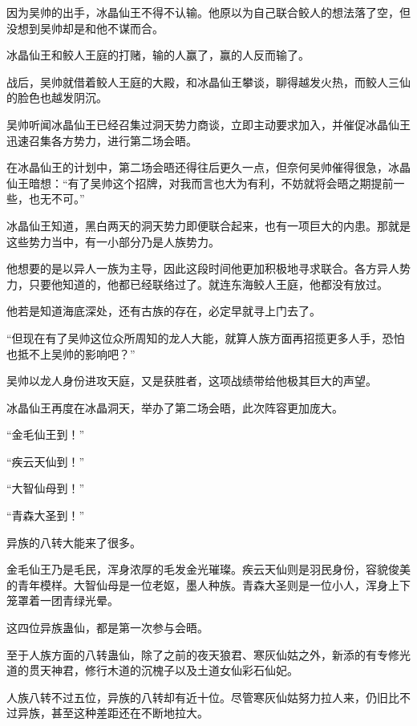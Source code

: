 
\begin{this_body}

因为吴帅的出手，冰晶仙王不得不认输。他原以为自己联合鲛人的想法落了空，但没想到吴帅却是和他不谋而合。

冰晶仙王和鲛人王庭的打赌，输的人赢了，赢的人反而输了。

战后，吴帅就借着鲛人王庭的大殿，和冰晶仙王攀谈，聊得越发火热，而鲛人三仙的脸色也越发阴沉。

吴帅听闻冰晶仙王已经召集过洞天势力商谈，立即主动要求加入，并催促冰晶仙王迅速召集各方势力，进行第二场会晤。

在冰晶仙王的计划中，第二场会晤还得往后更久一点，但奈何吴帅催得很急，冰晶仙王暗想：“有了吴帅这个招牌，对我而言也大为有利，不妨就将会晤之期提前一些，也无不可。”

冰晶仙王知道，黑白两天的洞天势力即便联合起来，也有一项巨大的内患。那就是这些势力当中，有一小部分乃是人族势力。

他想要的是以异人一族为主导，因此这段时间他更加积极地寻求联合。各方异人势力，只要他知道的，他都已经联络过了。就连东海鲛人王庭，他都没有放过。

他若是知道海底深处，还有古族的存在，必定早就寻上门去了。

“但现在有了吴帅这位众所周知的龙人大能，就算人族方面再招揽更多人手，恐怕也抵不上吴帅的影响吧？”

吴帅以龙人身份进攻天庭，又是获胜者，这项战绩带给他极其巨大的声望。

冰晶仙王再度在冰晶洞天，举办了第二场会晤，此次阵容更加庞大。

“金毛仙王到！”

“疾云天仙到！”

“大智仙母到！”

“青森大圣到！”

异族的八转大能来了很多。

金毛仙王乃是毛民，浑身浓厚的毛发金光璀璨。疾云天仙则是羽民身份，容貌俊美的青年模样。大智仙母是一位老妪，墨人种族。青森大圣则是一位小人，浑身上下笼罩着一团青绿光晕。

这四位异族蛊仙，都是第一次参与会晤。

至于人族方面的八转蛊仙，除了之前的夜天狼君、寒灰仙姑之外，新添的有专修光道的贯天神君，修行木道的沉槐子以及土道女仙彩石仙妃。

人族八转不过五位，异族的八转却有近十位。尽管寒灰仙姑努力拉人来，仍旧比不过异族，甚至这种差距还在不断地拉大。


\end{this_body}
